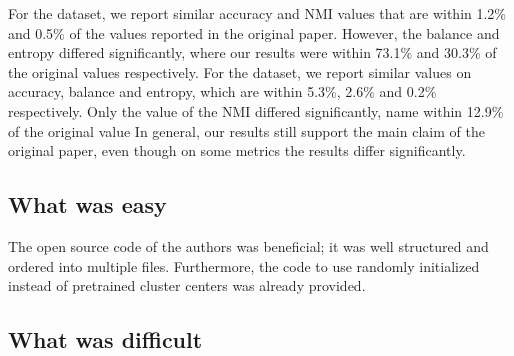 For the \USPSMNIST dataset, we report similar accuracy and NMI values that are within 1.2\% and 0.5\% of the values reported in the original paper. However, the balance and entropy differed significantly, where our results were within 73.1\% and 30.3\% of the original values respectively. For the \revMNIST dataset, we report similar values on accuracy, balance and entropy, which are within 5.3\%, 2.6\% and 0.2\% respectively. Only the value of the NMI differed significantly, name within 12.9\% of the original value In general, our results still support the main claim of the original paper, even though on some metrics the results differ significantly.

\subsection*{What was easy}

The open source code of the authors was beneficial; it was well structured and ordered into multiple files. Furthermore, the code to use randomly initialized instead of pretrained cluster centers was already provided.

\subsection*{What was difficult}



